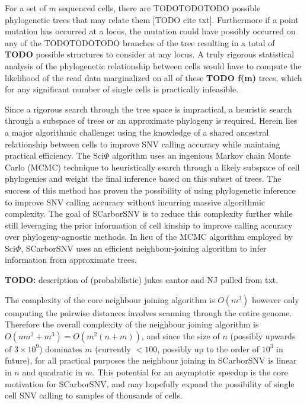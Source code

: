 \documentclass[../../main.tex]{subfiles}
\begin{document}
For a set of $m$ sequenced cells, there are TODOTODOTODO possible phylogenetic trees that may relate them [TODO cite txt].
Furthermore if a point mutation has occurred at a locus, the mutation could have possibly occurred on any of the TODOTODOTODO branches of the tree resulting in a total of \textbf{TODO} possible structures to consider at any locus.
A truly rigorous statistical analysis of the phylogenetic relationship between cells would have to compute the likelihood of the read data marginalized on all of these \textbf{TODO f(m)} trees, which for any significant number of single cells is practically infeasible.


Since a rigorous search through the tree space is impractical, a heuristic search through a subspace of trees or an approximate phylogeny is required.
Herein lies a major algorithmic challenge: using the knowledge of a shared ancestral relationship between cells to improve SNV calling accuracy while maintaing practical efficiency.
The Sci$\Phi$ algorithm uses an ingenious Markov chain Monte Carlo (MCMC) technique to heuristically search through a likely subspace of cell phylogenies and weight the final inference based on this subset of trees.
The success of this method has proven the possibility of using phylogenetic inference to improve SNV calling accuracy without incurring massive algorithmic complexity.
The goal of SCarborSNV is to reduce this complexity further while still leveraging the prior information of cell kinship to improve calling accuracy over phylogeny-agnostic methods.
In lieu of the MCMC algorithm employed by Sci$\Phi$, SCarborSNV uses an efficient neighbour-joining algorithm to infer information from approximate trees.

\textbf{TODO:} description of (probabilistic) jukes cantor and NJ pulled from txt.

The complexity of the core neighbour joining algorithm is $O(m^3)$ however only computing the pairwise distances involves scanning through the entire genome.
Therefore the overall complexity of the neighbour joining algorithm is $O(nm^2 + m^3) = O(m^2(n+m))$, and since the size of $n$ (possibly upwards of $3\times10^9$) dominates $m$ (currently $<100$, possibly up to the order of $10^3$ in future), for all practical purposes the neighbour joining in SCarborSNV is linear in $n$ and quadratic in $m$.
This potential for an asymptotic speedup is the core motivation for SCarborSNV, and may hopefully expand the possibility of single cell SNV calling to samples of thousands of cells.
\end{document}
